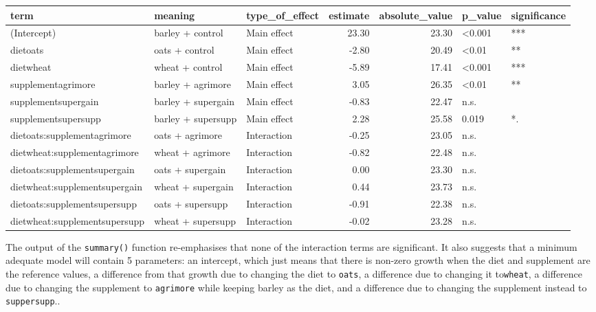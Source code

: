 \documentclass[
  letterpaper,
  DIV=11,
  numbers=noendperiod]{scrreprt}
\begin{document}
\begin{table}
\centering
\begin{tabular}[t]{l|l|l|r|r|l|l}
\hline
term & meaning & type\_of\_effect & estimate & absolute\_value & p\_value & significance\\
\hline
(Intercept) & barley + control & Main effect & 23.30 & 23.30 & <0.001 & ***\\
\hline
dietoats & oats + control & Main effect & -2.80 & 20.49 & <0.01 & **\\
\hline
dietwheat & wheat + control & Main effect & -5.89 & 17.41 & <0.001 & ***\\
\hline
supplementagrimore & barley + agrimore & Main effect & 3.05 & 26.35 & <0.01 & **\\
\hline
supplementsupergain & barley + supergain & Main effect & -0.83 & 22.47 & n.s. & \\
\hline
supplementsupersupp & barley + supersupp & Main effect & 2.28 & 25.58 & 0.019 & *.\\
\hline
dietoats:supplementagrimore & oats + agrimore & Interaction & -0.25 & 23.05 & n.s. & \\
\hline
dietwheat:supplementagrimore & wheat + agrimore & Interaction & -0.82 & 22.48 & n.s. & \\
\hline
dietoats:supplementsupergain & oats + supergain & Interaction & 0.00 & 23.30 & n.s. & \\
\hline
dietwheat:supplementsupergain & wheat + supergain & Interaction & 0.44 & 23.73 & n.s. & \\
\hline
dietoats:supplementsupersupp & oats + supersupp & Interaction & -0.91 & 22.38 & n.s. & \\
\hline
dietwheat:supplementsupersupp & wheat + supersupp & Interaction & -0.02 & 23.28 & n.s. & \\
\hline
\end{tabular}
\end{table}

The output of the \texttt{summary()} function re-emphasises that none of
the interaction terms are significant. It also suggests that a minimum
adequate model will contain 5 parameters: an intercept, which just means
that there is non-zero growth when the diet and supplement are the
reference values, a difference from that growth due to changing the diet
to \texttt{oats}, a difference due to changing it to\texttt{wheat}, a
difference due to changing the supplement to \texttt{agrimore} while
keeping barley as the diet, and a difference due to changing the
supplement instead to \texttt{suppersupp}..
\end{document}
